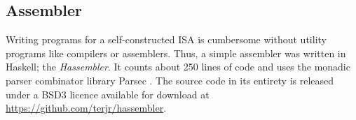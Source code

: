 
\subsection{Assembler}

Writing programs for a self-constructed ISA is cumbersome without utility
programs like compilers or assemblers. Thus, a simple assembler was written in
Haskell; the \textit{Hassembler}. It counts about 250 lines of code and uses the
monadic parser combinator library Parsec \cite{parsec}. The source code in its entirety is
released under a BSD3 licence available for download at
\url{https://github.com/terjr/hassembler}.
